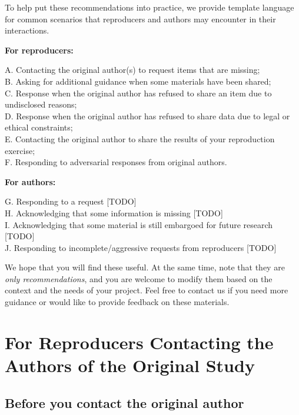 \documentclass[]{book}
\begin{document}
To help put these recommendations into practice, we provide template language for common scenarios that reproducers and authors may encounter in their interactions.

\textbf{For reproducers:}

A. Contacting the original author(s) to request items that are missing;\\
B. Asking for additional guidance when some materials have been shared;\\
C. Response when the original author has refused to share an item due to undisclosed reasons;\\
D. Response when the original author has refused to share data due to legal or ethical constraints;\\
E. Contacting the original author to share the results of your reproduction exercise;\\
F. Responding to adversarial responses from original authors.

\textbf{For authors:}

G. Responding to a request {[}TODO{]}\\
H. Acknowledging that some information is missing {[}TODO{]}\\
I. Acknowledging that some material is still embargoed for future research {[}TODO{]}\\
J. Responding to incomplete/aggressive requests from reproducers {[}TODO{]}

We hope that you will find these useful. At the same time, note that they are \emph{only recommendations}, and you are welcome to modify them based on the context and the needs of your project. Feel free to contact us if you need more guidance or would like to provide feedback on these materials.

\hypertarget{for-reproducers-contacting-the-authors-of-the-original-study}{%
\section{For Reproducers Contacting the Authors of the Original Study}\label{for-reproducers-contacting-the-authors-of-the-original-study}}

\hypertarget{before-you-contact-the-original-author}{%
\subsection{Before you contact the original author}\label{before-you-contact-the-original-author}}
\end{document}

